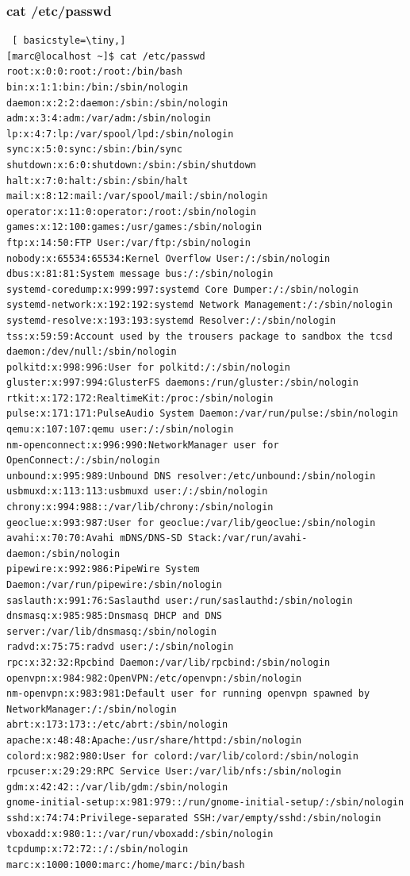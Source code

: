 \documentclass[preprint,11pt]{elsarticle}
\begin{document}
\subsubsection{cat /etc/passwd}
\begin{lstlisting} [ basicstyle=\tiny,]
[marc@localhost ~]$ cat /etc/passwd
root:x:0:0:root:/root:/bin/bash
bin:x:1:1:bin:/bin:/sbin/nologin
daemon:x:2:2:daemon:/sbin:/sbin/nologin
adm:x:3:4:adm:/var/adm:/sbin/nologin
lp:x:4:7:lp:/var/spool/lpd:/sbin/nologin
sync:x:5:0:sync:/sbin:/bin/sync
shutdown:x:6:0:shutdown:/sbin:/sbin/shutdown
halt:x:7:0:halt:/sbin:/sbin/halt
mail:x:8:12:mail:/var/spool/mail:/sbin/nologin
operator:x:11:0:operator:/root:/sbin/nologin
games:x:12:100:games:/usr/games:/sbin/nologin
ftp:x:14:50:FTP User:/var/ftp:/sbin/nologin
nobody:x:65534:65534:Kernel Overflow User:/:/sbin/nologin
dbus:x:81:81:System message bus:/:/sbin/nologin
systemd-coredump:x:999:997:systemd Core Dumper:/:/sbin/nologin
systemd-network:x:192:192:systemd Network Management:/:/sbin/nologin
systemd-resolve:x:193:193:systemd Resolver:/:/sbin/nologin
tss:x:59:59:Account used by the trousers package to sandbox the tcsd daemon:/dev/null:/sbin/nologin
polkitd:x:998:996:User for polkitd:/:/sbin/nologin
gluster:x:997:994:GlusterFS daemons:/run/gluster:/sbin/nologin
rtkit:x:172:172:RealtimeKit:/proc:/sbin/nologin
pulse:x:171:171:PulseAudio System Daemon:/var/run/pulse:/sbin/nologin
qemu:x:107:107:qemu user:/:/sbin/nologin
nm-openconnect:x:996:990:NetworkManager user for OpenConnect:/:/sbin/nologin
unbound:x:995:989:Unbound DNS resolver:/etc/unbound:/sbin/nologin
usbmuxd:x:113:113:usbmuxd user:/:/sbin/nologin
chrony:x:994:988::/var/lib/chrony:/sbin/nologin
geoclue:x:993:987:User for geoclue:/var/lib/geoclue:/sbin/nologin
avahi:x:70:70:Avahi mDNS/DNS-SD Stack:/var/run/avahi-daemon:/sbin/nologin
pipewire:x:992:986:PipeWire System Daemon:/var/run/pipewire:/sbin/nologin
saslauth:x:991:76:Saslauthd user:/run/saslauthd:/sbin/nologin
dnsmasq:x:985:985:Dnsmasq DHCP and DNS server:/var/lib/dnsmasq:/sbin/nologin
radvd:x:75:75:radvd user:/:/sbin/nologin
rpc:x:32:32:Rpcbind Daemon:/var/lib/rpcbind:/sbin/nologin
openvpn:x:984:982:OpenVPN:/etc/openvpn:/sbin/nologin
nm-openvpn:x:983:981:Default user for running openvpn spawned by NetworkManager:/:/sbin/nologin
abrt:x:173:173::/etc/abrt:/sbin/nologin
apache:x:48:48:Apache:/usr/share/httpd:/sbin/nologin
colord:x:982:980:User for colord:/var/lib/colord:/sbin/nologin
rpcuser:x:29:29:RPC Service User:/var/lib/nfs:/sbin/nologin
gdm:x:42:42::/var/lib/gdm:/sbin/nologin
gnome-initial-setup:x:981:979::/run/gnome-initial-setup/:/sbin/nologin
sshd:x:74:74:Privilege-separated SSH:/var/empty/sshd:/sbin/nologin
vboxadd:x:980:1::/var/run/vboxadd:/sbin/nologin
tcpdump:x:72:72::/:/sbin/nologin
marc:x:1000:1000:marc:/home/marc:/bin/bash

\end{lstlisting}
    
\end{document}
